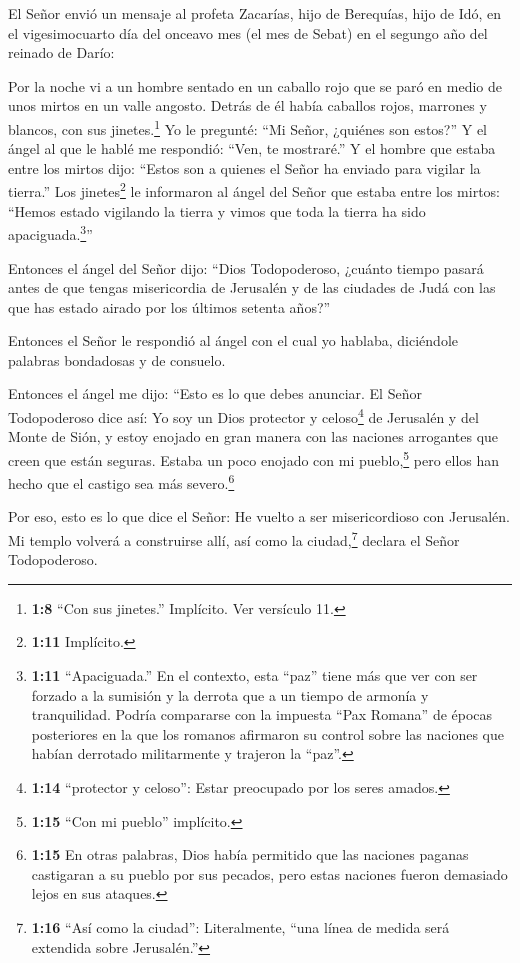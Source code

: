  El Señor envió un mensaje al profeta Zacarías, hijo de
Berequías, hijo de Idó, en el vigesimocuarto día del onceavo mes (el mes
de Sebat) en el segungo año del reinado de Darío:

 Por la noche vi a un hombre sentado en un caballo rojo que
se paró en medio de unos mirtos en un valle angosto. Detrás de él había
caballos rojos, marrones y blancos, con sus jinetes.\footnote{\textbf{1:8}
  ``Con sus jinetes.'' Implícito. Ver versículo 11.}  Yo le
pregunté: ``Mi Señor, ¿quiénes son estos?'' Y el ángel al que le hablé
me respondió: ``Ven, te mostraré.''  Y el hombre que estaba
entre los mirtos dijo: ``Estos son a quienes el Señor ha enviado para
vigilar la tierra.''  Los jinetes\footnote{\textbf{1:11}
  Implícito.} le informaron al ángel del Señor que estaba entre los
mirtos: ``Hemos estado vigilando la tierra y vimos que toda la tierra ha
sido apaciguada.\footnote{\textbf{1:11} ``Apaciguada.'' En el contexto,
  esta ``paz'' tiene más que ver con ser forzado a la sumisión y la
  derrota que a un tiempo de armonía y tranquilidad. Podría compararse
  con la impuesta ``Pax Romana'' de épocas posteriores en la que los
  romanos afirmaron su control sobre las naciones que habían derrotado
  militarmente y trajeron la ``paz''.}''

 Entonces el ángel del Señor dijo: ``Dios Todopoderoso,
¿cuánto tiempo pasará antes de que tengas misericordia de Jerusalén y de
las ciudades de Judá con las que has estado airado por los últimos
setenta años?''

 Entonces el Señor le respondió al ángel con el cual yo
hablaba, diciéndole palabras bondadosas y de consuelo.

 Entonces el ángel me dijo: ``Esto es lo que debes
anunciar. El Señor Todopoderoso dice así: Yo soy un Dios protector y
celoso\footnote{\textbf{1:14} ``protector y celoso'': Estar preocupado
  por los seres amados.} de Jerusalén y del Monte de Sión, 
y estoy enojado en gran manera con las naciones arrogantes que creen que
están seguras. Estaba un poco enojado con mi pueblo,\footnote{\textbf{1:15}
  ``Con mi pueblo'' implícito.} pero ellos han hecho que el castigo sea
más severo.\footnote{\textbf{1:15} En otras palabras, Dios había
  permitido que las naciones paganas castigaran a su pueblo por sus
  pecados, pero estas naciones fueron demasiado lejos en sus ataques.}

 Por eso, esto es lo que dice el Señor: He vuelto a ser
misericordioso con Jerusalén. Mi templo volverá a construirse allí, así
como la ciudad,\footnote{\textbf{1:16} ``Así como la ciudad'':
  Literalmente, ``una línea de medida será extendida sobre Jerusalén.''}
declara el Señor Todopoderoso.

